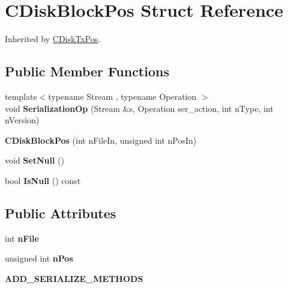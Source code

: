 \hypertarget{struct_c_disk_block_pos}{}\section{C\+Disk\+Block\+Pos Struct Reference}
\label{struct_c_disk_block_pos}


Inherited by \mbox{\hyperlink{struct_c_disk_tx_pos}{C\+Disk\+Tx\+Pos}}.

\subsection*{Public Member Functions}
\begin{DoxyCompactItemize}
\item 
\mbox{\label{struct_c_disk_block_pos_a821bb4eebc99ae39c20133d80244325f}} 
{\footnotesize template$<$typename Stream , typename Operation $>$ }\\void {\bfseries Serialization\+Op} (Stream \&s, Operation ser\+\_\+action, int n\+Type, int n\+Version)
\item 
\mbox{\label{struct_c_disk_block_pos_a0c96947d09bb4aaf28ab2d7866d20918}} 
{\bfseries C\+Disk\+Block\+Pos} (int n\+File\+In, unsigned int n\+Pos\+In)
\item 
\mbox{\label{struct_c_disk_block_pos_a0a6ba113219a456472081ee6d6b20a72}} 
void {\bfseries Set\+Null} ()
\item 
\mbox{\label{struct_c_disk_block_pos_a7dd98fe3f5372d358df61db31899b0af}} 
bool {\bfseries Is\+Null} () const
\end{DoxyCompactItemize}
\subsection*{Public Attributes}
\begin{DoxyCompactItemize}
\item 
\mbox{\label{struct_c_disk_block_pos_a09f30dab5c02fbdea8a17f9bcee5aac8}} 
int {\bfseries n\+File}
\item 
\mbox{\label{struct_c_disk_block_pos_a9b4b5e149b655ac5c22d05883b5bca0e}} 
unsigned int {\bfseries n\+Pos}
\item 
\mbox{\label{struct_c_disk_block_pos_a958cd730b290bbb0153d514c56517590}} 
{\bfseries A\+D\+D\+\_\+\+S\+E\+R\+I\+A\+L\+I\+Z\+E\+\_\+\+M\+E\+T\+H\+O\+DS}
\end{DoxyCompactItemize}
